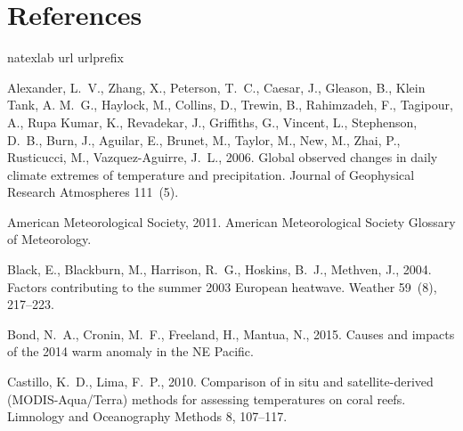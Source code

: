 \documentclass[a4paper,10pt,review]{elsarticle}
\begin{document}
\section*{References}


\begin{thebibliography}{52}
\expandafter\ifx\csname natexlab\endcsname\relax\def\natexlab#1{#1}\fi
\expandafter\ifx\csname url\endcsname\relax
  \def\url#1{\texttt{#1}}\fi
\expandafter\ifx\csname urlprefix\endcsname\relax\def\urlprefix{URL }\fi

Alexander, L.~V., Zhang, X., Peterson, T.~C., Caesar, J., Gleason, B., {Klein
  Tank}, A. M.~G., Haylock, M., Collins, D., Trewin, B., Rahimzadeh, F.,
  Tagipour, A., {Rupa Kumar}, K., Revadekar, J., Griffiths, G., Vincent, L.,
  Stephenson, D.~B., Burn, J., Aguilar, E., Brunet, M., Taylor, M., New, M.,
  Zhai, P., Rusticucci, M., Vazquez-Aguirre, J.~L., 2006. {Global observed
  changes in daily climate extremes of temperature and precipitation}. Journal
  of Geophysical Research Atmospheres 111~(5).

{American Meteorological Society}, 2011. {American Meteorological Society
  Glossary of Meteorology}.

Black, E., Blackburn, M., Harrison, R.~G., Hoskins, B.~J., Methven, J., 2004.
  {Factors contributing to the summer 2003 European heatwave}. Weather 59~(8),
  217--223.

Bond, N.~A., Cronin, M.~F., Freeland, H., Mantua, N., 2015. {Causes and impacts
  of the 2014 warm anomaly in the NE Pacific}.

Castillo, K.~D., Lima, F.~P., 2010. {Comparison of in situ and
  satellite-derived (MODIS-Aqua/Terra) methods for assessing temperatures on
  coral reefs}. Limnology and Oceanography Methods 8, 107--117.


\end{thebibliography}
\end{document}

